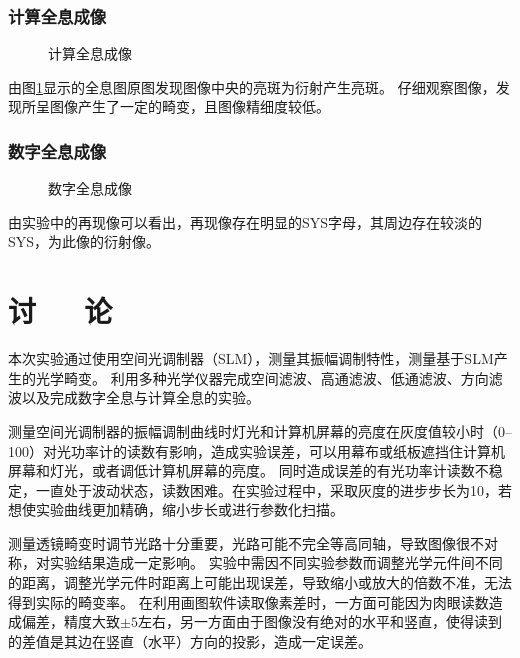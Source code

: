 \documentclass[10pt,a4paper,twoside,UTF8]{ctexart}
\begin{document}
\subsubsection{计算全息成像}
\begin{figure}[H]
	\centering

	\caption{计算全息成像}
	\label{fig:holo1}
\end{figure}

由图\ref{fig:holo1}显示的全息图原图发现图像中央的亮斑为衍射产生亮斑。
仔细观察图像，发现所呈图像产生了一定的畸变，且图像精细度较低。


\subsubsection{数字全息成像}
\begin{figure}[H]
	\centering

	\caption{数字全息成像}
	\label{fig:holo2}
\end{figure}

由实验中的再现像可以看出，再现像存在明显的SYS字母，其周边存在较淡的SYS，为此像的衍射像。

\section{讨~~~论}
本次实验通过使用空间光调制器（SLM），测量其振幅调制特性，测量基于SLM产生的光学畸变。
利用多种光学仪器完成空间滤波、高通滤波、低通滤波、方向滤波以及完成数字全息与计算全息的实验。

测量空间光调制器的振幅调制曲线时灯光和计算机屏幕的亮度在灰度值较小时（0--100）对光功率计的读数有影响，造成实验误差，可以用幕布或纸板遮挡住计算机屏幕和灯光，或者调低计算机屏幕的亮度。
同时造成误差的有光功率计读数不稳定，一直处于波动状态，读数困难。在实验过程中，采取灰度的进步步长为10，若想使实验曲线更加精确，缩小步长或进行参数化扫描。

测量透镜畸变时调节光路十分重要，光路可能不完全等高同轴，导致图像很不对称，对实验结果造成一定影响。
实验中需因不同实验参数而调整光学元件间不同的距离，调整光学元件时距离上可能出现误差，导致缩小或放大的倍数不准，无法得到实际的畸变率。
在利用画图软件读取像素差时，一方面可能因为肉眼读数造成偏差，精度大致$\pm 5$左右，另一方面由于图像没有绝对的水平和竖直，使得读到的差值是其边在竖直（水平）方向的投影，造成一定误差。
\end{document}
